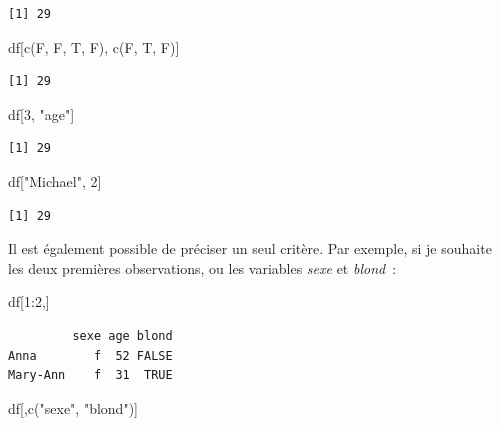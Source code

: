 \documentclass[
  letterpaper,
  DIV=11,
  numbers=noendperiod,
  oneside]{scrreprt}
\newenvironment{Shaded}{\begin{snugshade}}{\end{snugshade}}
\newcommand{\DecValTok}[1]{\textcolor[rgb]{0.68,0.00,0.00}{#1}}
\newcommand{\FunctionTok}[1]{\textcolor[rgb]{0.28,0.35,0.67}{#1}}
\newcommand{\NormalTok}[1]{\textcolor[rgb]{0.00,0.23,0.31}{#1}}
\newcommand{\SpecialCharTok}[1]{\textcolor[rgb]{0.37,0.37,0.37}{#1}}
\newcommand{\StringTok}[1]{\textcolor[rgb]{0.13,0.47,0.30}{#1}}
\begin{document}
\begin{verbatim}
[1] 29
\end{verbatim}

\begin{Shaded}
\begin{Highlighting}[]
\NormalTok{df[}\FunctionTok{c}\NormalTok{(F, F, T, F), }\FunctionTok{c}\NormalTok{(F, T, F)]}
\end{Highlighting}
\end{Shaded}

\begin{verbatim}
[1] 29
\end{verbatim}

\begin{Shaded}
\begin{Highlighting}[]
\NormalTok{df[}\DecValTok{3}\NormalTok{, }\StringTok{"age"}\NormalTok{]}
\end{Highlighting}
\end{Shaded}

\begin{verbatim}
[1] 29
\end{verbatim}

\begin{Shaded}
\begin{Highlighting}[]
\NormalTok{df[}\StringTok{"Michael"}\NormalTok{, }\DecValTok{2}\NormalTok{]}
\end{Highlighting}
\end{Shaded}

\begin{verbatim}
[1] 29
\end{verbatim}

Il est également possible de préciser un seul critère. Par exemple, si
je souhaite les deux premières observations, ou les variables
\emph{sexe} et \emph{blond}~:

\begin{Shaded}
\begin{Highlighting}[]
\NormalTok{df[}\DecValTok{1}\SpecialCharTok{:}\DecValTok{2}\NormalTok{,]}
\end{Highlighting}
\end{Shaded}

\begin{verbatim}
         sexe age blond
Anna        f  52 FALSE
Mary-Ann    f  31  TRUE
\end{verbatim}

\begin{Shaded}
\begin{Highlighting}[]
\NormalTok{df[,}\FunctionTok{c}\NormalTok{(}\StringTok{"sexe"}\NormalTok{, }\StringTok{"blond"}\NormalTok{)]}
\end{Highlighting}
\end{Shaded}
\end{document}
